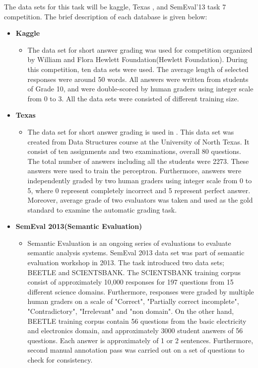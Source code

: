\documentclass{article}
\begin{document}
The data sets for this task will be kaggle\cite{kaggle}, Texas \cite{texas}, and SemEval'13 task 7 competition. The brief description of each database is given below:
	\begin{itemize}
	
	
	\item \textbf{Kaggle}
		\begin{itemize}
		\item The data set for short answer grading was used for competition organized by William and Flora Hewlett Foundation(Hewlett Foundation). During this competition, ten data sets were used. The average length of selected responses were around 50 words. All answers were written from students of Grade 10, and were double-scored by human graders using integer scale from 0 to 3. All the data sets were consisted of different training size.   
		\end{itemize}
	\item \textbf{Texas}
		\begin{itemize}
		\item The data set for short answer grading is used in \cite{texas}. This data set was created from Data Structures course at the University of North Texas. It consist of ten assignments and two examinations, overall 80 questions. The total number of answers including all the students were 2273. These answers were used to train the perceptron. Furthermore, answers were independently graded by two human graders using integer scale from 0 to 5, where 0 represent completely incorrect and 5 represent perfect answer. Moreover, average grade of two evaluators was taken and used as the gold standard to examine the automatic grading task.
		\end{itemize}
		
	\item \textbf{SemEval 2013(Semantic Evaluation)}
		\begin{itemize}
		\item Semantic Evaluation is an ongoing series of evaluations to evaluate semantic analysis systems\cite{semWiki}. SemEval 2013 data set was part of semantic evaluation workshop in 2013. The task introduced two data sets; BEETLE and SCIENTSBANK. The SCIENTSBANK training corpus consist of approximately 10,000 responses for 197 questions from 15 different science domains. Furthermore, responses were graded by multiple human graders on a scale of "Correct", "Partially correct incomplete", "Contradictory", "Irrelevant" and "non domain"\cite{iterative}. On the other hand, BEETLE training corpus contain 56 questions from the basic electricity and electronics domain, and approximately 3000 student answers of 56 questions. Each answer is approximately of 1 or 2 sentences. Furthermore, second manual annotation pass was carried out on a set of questions to check for consistency.\cite{semEval2013}
		\end{itemize}




\end{itemize}
\end{document}
